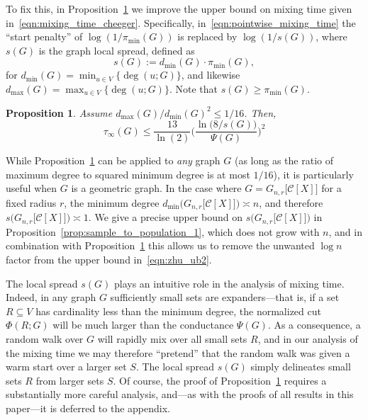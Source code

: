 \documentclass[11pt,twoside]{article}
\newtheorem{proposition}{Proposition}
\theoremstyle{definition}
\newcommand{\1}{\mathbf{1}}
\newcommand{\mc}[1]{\mathcal{#1}}
\begin{document}
To fix this, in Proposition~\ref{prop:pointwise_mixing_time} we improve the upper bound on mixing time given in~\eqref{eqn:mixing_time_cheeger}. Specifically, in~\eqref{eqn:pointwise_mixing_time} the ``start penalty'' of $\log(1/\pi_{\min}(G))$ is replaced by $\log(1/s(G))$, where $s(G)$ is the graph local spread, defined as
\begin{equation*}
s(G) := d_{\min}(G) \cdot \pi_{\min}(G),
\end{equation*}
for $d_{\min}(G) = \min_{u \in V}\bigl\{\deg(u;G)\bigr\}$, and likewise $d_{\max}(G) = \max_{u \in V}\bigl\{\deg(u;G)\bigr\}$. Note that $s(G) \geq \pi_{\min}(G)$.
\begin{proposition}
	\label{prop:pointwise_mixing_time}
	Assume $d_{\max}(G)/d_{\min}(G)^2 \leq 1/16$. Then,
	\begin{equation}
	\label{eqn:pointwise_mixing_time}
	\tau_{\infty}(G) \leq \frac{13}{\ln(2)} \biggl(\frac{\ln\bigl(8/s(G)\bigr)}{\Psi(G)}\biggr)^2
	\end{equation}
\end{proposition}
While Proposition~\ref{prop:pointwise_mixing_time} can be applied to \emph{any} graph $G$ (as long as the ratio of maximum degree to squared minimum degree is at most $1/16$), it is particularly useful when $G$ is a geometric graph. In the case where $G = G_{n,r}\bigl[\mc{C}[X]\bigr]$ for a fixed radius $r$, the minimum degree $d_{\min}\bigl(G_{n,r}\bigl[\mc{C}[X]\bigr]\bigr) \asymp n$, and therefore $s\bigl(G_{n,r}\bigl[\mc{C}[X]\bigr]\bigr) \asymp 1$. We give a precise upper bound on $s\bigl(G_{n,r}\bigl[\mc{C}[X]\bigr]\bigr)$ in Proposition~\ref{prop:sample_to_population_1}, which does not grow with $n$, and in combination with Proposition~\ref{prop:pointwise_mixing_time} this allows us to remove the unwanted $\log n$ factor from the upper bound in~\eqref{eqn:zhu_ub2}. 

The local spread $s(G)$ plays an intuitive role in the analysis of mixing time. Indeed, in any graph $G$ sufficiently small sets are expanders---that is, if a set $R \subseteq V$ has cardinality less than the minimum degree, the normalized cut $\Phi(R;G)$ will be much larger than the conductance $\Psi(G)$. As a consequence, a random walk over $G$ will rapidly mix over all small sets $R$, and in our analysis of the mixing time we may therefore ``pretend'' that the random walk was given a warm start over a larger set $S$. The local spread $s(G)$ simply delineates small sets $R$ from larger sets $S$. Of course, the proof of Proposition~\ref{prop:pointwise_mixing_time} requires a substantially more careful analysis, and---as with the proofs of all results in this paper---it is deferred to the appendix.
\end{document}
